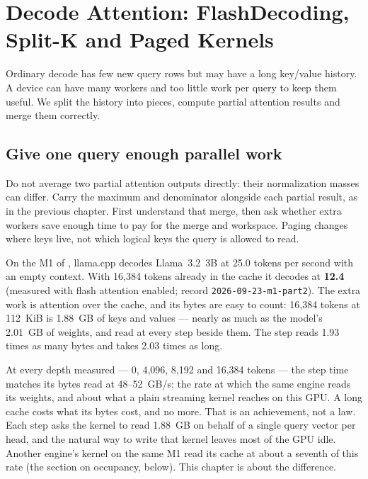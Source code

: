 \chapter{Decode Attention: FlashDecoding, Split-K and Paged Kernels}\label{ch:decode-attention}

\begin{ChapterIntent}
Ordinary decode has few new query rows but may have a long key/value history. A device
can have many workers and too little work per query to keep them useful. We split the
history into pieces, compute partial attention results and merge them correctly.
\end{ChapterIntent}

\section*{Give one query enough parallel work}
Do not average two partial attention outputs directly: their normalization masses can
differ. Carry the maximum and denominator alongside each partial result, as in the
previous chapter. First understand that merge, then ask whether extra workers save
enough time to pay for the merge and workspace. Paging changes where keys live, not
which logical keys the query is allowed to read.


On the M1 of , llama.cpp decodes Llama~3.2~3B at 25.0 tokens
per second with an empty context. With 16,384 tokens already in the cache it
decodes at \textbf{12.4} (measured with flash attention enabled; record
\texttt{2026-09-23-m1-part2}). The extra work is attention over the cache, and
its bytes are easy to count: 16,384 tokens at 112~KiB is 1.88~GB of keys and
values --- nearly as much as the model's 2.01~GB of weights, and read at every
step beside them. The step reads 1.93 times as many bytes and takes 2.03 times
as long.

At every depth measured --- 0, 4,096, 8,192 and 16,384 tokens --- the step time
matches its bytes read at 48--52~GB/s: the rate at which the same engine reads
its weights, and about what a plain streaming kernel reaches on this GPU. A
long cache costs what its bytes cost, and no more. That is an achievement, not
a law. Each step asks the kernel to read 1.88~GB on behalf of a single query
vector per head, and the natural way to write that kernel leaves most of the
GPU idle. Another engine's kernel on the same M1 read its cache at about a
seventh of this rate (the section on occupancy, below). This chapter is about
the difference.

